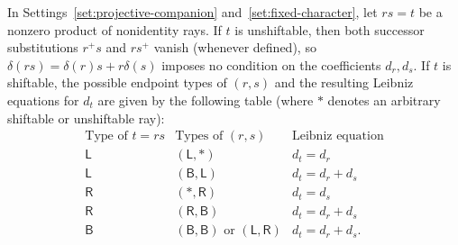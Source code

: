 \begin{lemma}
\label{lem:successor-substitutions}
In Settings~\ref{set:projective-companion} and~\ref{set:fixed-character}, let $rs=t$ be a nonzero product of nonidentity rays. If $t$ is unshiftable, then both successor substitutions $r^+s$ and $rs^+$ vanish (whenever defined), so $\delta(rs)=\delta(r)s+r\delta(s)$ imposes no condition on the coefficients $d_r,d_s$. If $t$ is shiftable, the possible endpoint types of $(r,s)$ and the resulting Leibniz equations for $d_t$ are given by the following table (where $*$ denotes an arbitrary shiftable or unshiftable ray):
\begin{equation}
  \label{eq:product-type-table}
  \begin{array}{c|c|c}
  \text{Type of }t=rs & \text{Types of }(r,s) & \text{Leibniz equation} \\ \hline
  \mathsf L & (\mathsf L,*) & d_t=d_r \\
  \mathsf L & (\mathsf B,\mathsf L) & d_t=d_r+d_s \\
  \mathsf R & (*,\mathsf R) & d_t=d_s \\
  \mathsf R & (\mathsf R,\mathsf B) & d_t=d_r+d_s \\
  \mathsf B & (\mathsf B,\mathsf B)\text{ or }(\mathsf L,\mathsf R) & d_t=d_r+d_s.
  \end{array}
\end{equation}
\end{lemma}
